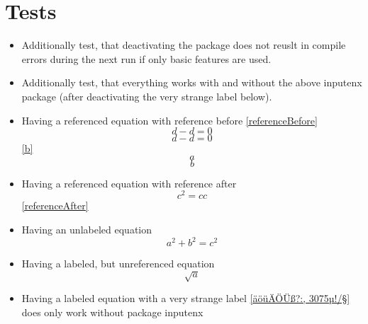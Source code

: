 \documentclass{article}
\begin{document}

	\section*{Tests}
	\begin{itemize}
		\item Additionally test, that deactivating the package does not reuslt in compile errors during the next run if only basic features are used.
		\item Additionally test, that everything works with and without the above inputenx package (after deactivating the very strange label below).
		\item Having a referenced equation with reference before \ref{referenceBefore}
			\begin{equation}\label{referenceBefore}
				d - d = 0
			\end{equation}
			\begin{equation}\label{referenceNo}
				d - d = 0
			\end{equation}
		\ref{b}\begin{equation}\label{a}a\end{equation}\begin{equation}\label{b}b\end{equation}
		\item Having a referenced equation with reference after
			\begin{equation}\label{referenceAfter}
				c^2 = c c
			\end{equation}
			\ref{referenceAfter}
		\item Having an unlabeled equation
			\begin{equation}\label{abc}
				a^2 + b^2 = c^2
			\end{equation}
		\item Having a labeled, but unreferenced equation
			\begin{equation}\label{unreferenced}
				\sqrt{a}
			\end{equation}
		\item Having a labeled equation with a very strange label \ref{äöüÄÖÜß?:, 3075µ!/§} does only work without package inputenx

\end{itemize}
\end{document}
